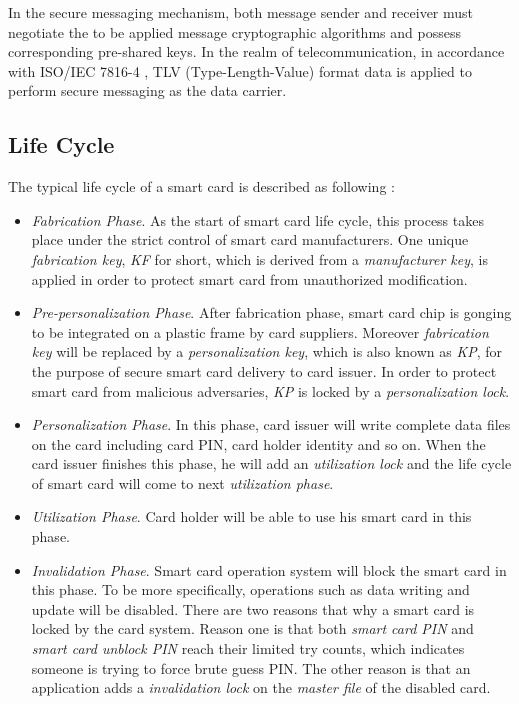 In the secure messaging mechanism, both message sender and receiver must negotiate the to be applied message cryptographic algorithms and possess corresponding pre-shared keys. In the realm of telecommunication, in accordance with ISO/IEC 7816-4 \cite{handbuch}, TLV (Type-Length-Value) format data is applied to perform secure messaging as the data carrier.

\subsection{Life Cycle} \label{secLC}
The typical life cycle of a smart card is described as following \cite{smart_card_contactless}:
\begin{itemize}
\item \emph{Fabrication Phase}. As the start of smart card life cycle, this process takes place under the strict control of smart card manufacturers. One unique \emph{fabrication key}, \emph{KF} for short, which is derived from a \emph{manufacturer key},  is applied in order to protect smart card from unauthorized modification. 
\item \emph{Pre-personalization Phase}. After fabrication phase,  smart card chip is gonging to be integrated on a plastic frame by card suppliers. Moreover \emph{fabrication key} will be replaced by a \emph{personalization key}, which is also known as \emph{KP},  for the purpose of secure smart card delivery to card issuer. In order to protect smart card from malicious adversaries, \emph{KP} is locked by a \emph{personalization lock}.
\item \emph{Personalization Phase}. In this phase,  card issuer will write complete data files on the card including card PIN, card holder identity and so on. When the card issuer finishes this phase, he will add an \emph{utilization lock} and the life cycle of smart card will come to next \emph{utilization phase}.
\item \emph{Utilization Phase}. Card holder will be able to use his smart card in this phase. 
\item \emph{Invalidation Phase}. Smart card operation system will block the smart card in this phase. To be more specifically, operations such as data writing and update will be disabled. There are two reasons that why a smart card is locked by the card system. Reason one is that both \emph{smart card PIN} and \emph{smart card unblock PIN} reach their limited  try counts, which indicates someone is trying to force brute guess PIN.  The other reason is that an application adds a \emph{invalidation lock} on the \emph{master file} of the disabled card.
\end{itemize}

